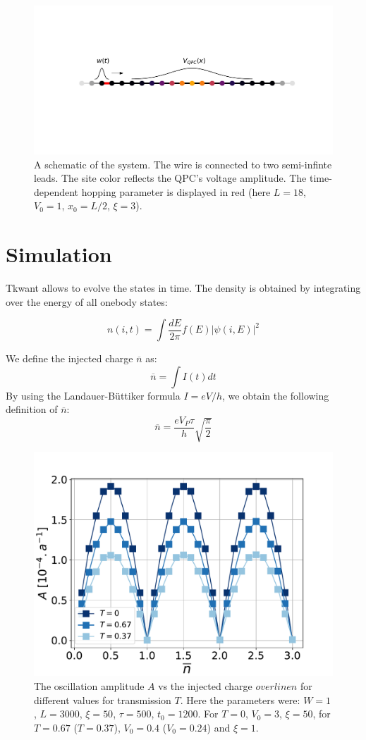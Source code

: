 \documentclass[aps,prl,preprint,groupedaddress]{revtex4-1}
\begin{document}
\begin{figure}[h]
	\centering
	\includegraphics[width = 0.9\linewidth]{../figures/syst_color_textv2}
	\caption{A schematic of the system. The wire is connected to two semi-infinte leads. The site color reflects the QPC's voltage amplitude. The time-dependent hopping parameter is displayed in red (here $L = 18$, $V_0 = 1$, $x_0 = L/2$, $\xi = 3$).}
	\label{fig:systcolor}
\end{figure}
\section{Simulation}
%
 Tkwant allows to evolve the states in time. The density is obtained by integrating over the energy of all onebody states:
 
 \begin{equation}
 n(i,t) = \int \frac{dE}{2\pi} f(E) |\psi(i,E)|^2
 \end{equation}
 
 We define the injected charge $\overline{n}$ as:
 \begin{equation}
 	\overline{n} = \int I(t)dt
 \end{equation}
 By using the Landauer-Büttiker formula $I = eV/h$, we obtain the following definition of $\overline{n}$:
 \begin{equation}
 	\overline{n} = \frac{eV_P\tau}{h}\sqrt{\frac{\pi}{2}}
 \end{equation}
 \begin{figure}
 	\centering
 	\includegraphics[width=0.7\linewidth]{../figures/A_vs_nbar_vs_transm}
 	\caption{The oscillation amplitude $A$ vs the injected charge $overline{n}$ for different values for transmission $T$. Here the parameters were: $W =1$, $L = 3000$, $\xi = 50$, $\tau = 500$, $t_0 = 1200$. For $T=0$, $V_0 =3$, $\xi = 50$, for $T=0.67$ ($T=0.37$), $V_0 =0.4$ ($V_0 = 0.24$) and $\xi = 1$.}
 	\label{fig:avsnbarw1l3000v03lx50ef2}
 \end{figure}
 
\end{document}
